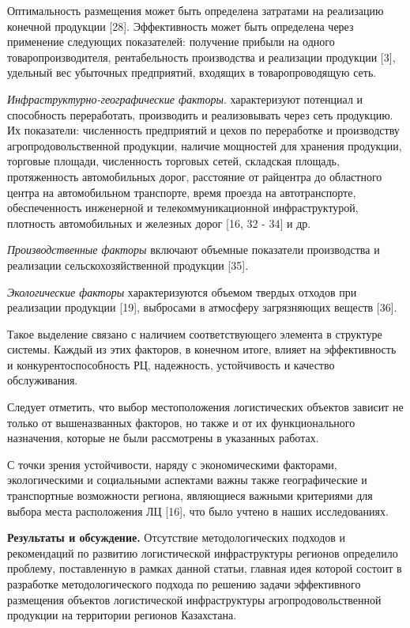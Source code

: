 \begin{multicols}{2}
Оптимальность размещения может быть определена затратами на реализацию
конечной продукции {[}28{]}. Эффективность может быть определена через
применение следующих показателей: получение прибыли на одного
товаропроизводителя, рентабельность производства и реализации продукции
{[}3{]}, удельный вес убыточных предприятий, входящих в товаропроводящую
сеть.

\emph{Инфраструктурно-географические факторы}. характеризуют потенциал и
способность переработать, производить и реализовывать через сеть
продукцию. Их показатели: численность предприятий и цехов по переработке
и производству агропродовольственной продукции, наличие мощностей для
хранения продукции, торговые площади, численность торговых сетей,
складская площадь, протяженность автомобильных дорог, расстояние от
райцентра до областного центра на автомобильном транспорте, время
проезда на автотранспорте, обеспеченность инженерной и
телекоммуникационной инфраструктурой, плотность автомобильных и железных
дорог {[}16, 32 - 34{]} и др.

\emph{Производственные факторы} включают объемные показатели
производства и реализации сельскохозяйственной продукции {[}35{]}.

\emph{Экологические факторы} характеризуются объемом твердых отходов при
реализации продукции {[}19{]}, выбросами в атмосферу загрязняющих
веществ {[}36{]}.

Такое выделение связано с наличием соответствующего элемента в структуре
системы. Каждый из этих факторов, в конечном итоге, влияет на
эффективность и конкурентоспособность РЦ, надежность, устойчивость и
качество обслуживания.

Следует отметить, что выбор местоположения логистических объектов
зависит не только от вышеназванных факторов, но также и от их
функционального назначения, которые не были рассмотрены в указанных
работах.

С точки зрения устойчивости, наряду с экономическими факторами,
экологическими и социальными аспектами важны также географические и
транспортные возможности региона, являющиеся важными критериями для
выбора места расположения ЛЦ {[}16{]}, что было учтено в наших
исследованиях.

{\bfseries Результаты и обсуждение.} Отсутствие методологических подходов и
рекомендаций по развитию логистической инфраструктуры регионов
определило проблему, поставленную в рамках данной статьи, главная идея
которой состоит в разработке методологического подхода по решению задачи
эффективного размещения объектов логистической инфраструктуры
агропродовольственной продукции на территории регионов Казахстана.


\end{multicols}
